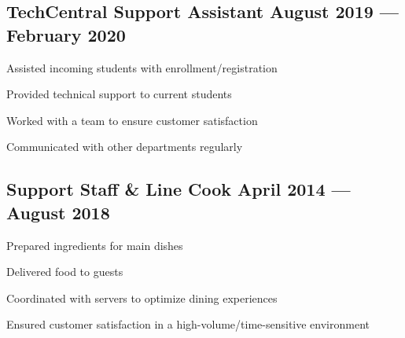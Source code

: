 \subsection{{TechCentral Support Assistant \hfill August 2019 --- February 2020}}
\begin{zitemize}
\item Assisted incoming students with enrollment/registration
\item Provided technical support to current students
\item Worked with a team to ensure customer satisfaction
\item Communicated with other departments regularly
\end{zitemize}

\subsection{{Support Staff \& Line Cook \hfill April 2014 --- August 2018}}
\begin{zitemize}
\item Prepared ingredients for main dishes
\item Delivered food to guests
\item Coordinated with servers to optimize dining experiences
\item Ensured customer satisfaction in a high-volume/time-sensitive environment
\end{zitemize}
